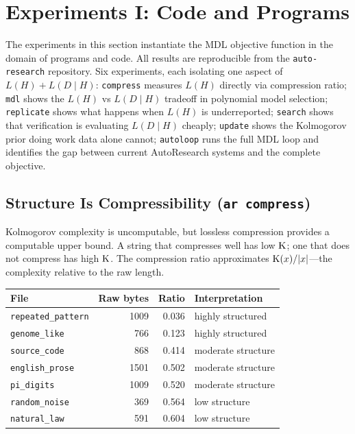 \section{Experiments I: Code and Programs}
\label{sec:experiments-code}

The experiments in this section instantiate the MDL objective function
in the domain of programs and code. All results are reproducible from
the \texttt{auto-research} repository. Six experiments, each isolating
one aspect of $L(H) + L(D \mid H)$: \texttt{compress} measures $L(H)$
directly via compression ratio; \texttt{mdl} shows the $L(H)$ vs
$L(D \mid H)$ tradeoff in polynomial model selection; \texttt{replicate}
shows what happens when $L(H)$ is underreported; \texttt{search} shows
that verification is evaluating $L(D \mid H)$ cheaply; \texttt{update}
shows the Kolmogorov prior doing work data alone cannot; \texttt{autoloop}
runs the full MDL loop and identifies the gap between current AutoResearch
systems and the complete objective.

\subsection{Structure Is Compressibility (\texttt{ar compress})}

Kolmogorov complexity is uncomputable, but lossless compression provides
a computable upper bound. A string that compresses well has low $\mathrm{K}$; one
that does not compress has high $\mathrm{K}$. The compression ratio approximates
$\mathrm{K}(x)/|x|$---the complexity relative to the raw length.

\begin{center}
\begin{tabular}{lrrl}
\toprule
File & Raw bytes & Ratio & Interpretation \\
\midrule
\texttt{repeated\_pattern} & 1009 & 0.036 & highly structured \\
\texttt{genome\_like}      &  766 & 0.123 & highly structured \\
\texttt{source\_code}      &  868 & 0.414 & moderate structure \\
\texttt{english\_prose}    & 1501 & 0.502 & moderate structure \\
\texttt{pi\_digits}        & 1009 & 0.520 & moderate structure \\
\texttt{random\_noise}     &  369 & 0.564 & low structure \\
\texttt{natural\_law}      &  591 & 0.604 & low structure \\
\bottomrule
\end{tabular}
\end{center}

